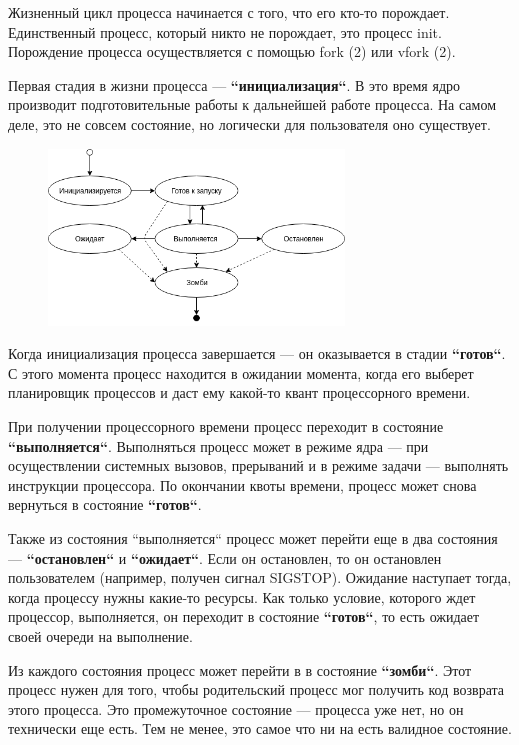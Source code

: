 Жизненный цикл процесса начинается с того, что его кто-то порождает. Единственный процесс, который никто не порождает, это процесс init. Порождение процесса осуществляется с помощью fork (2) или vfork (2). 

Первая стадия в жизни процесса --- \textbf{“инициализация“}. В это время ядро производит подготовительные работы к дальнейшей работе процесса. На самом деле, это не совсем состояние, но логически для пользователя оно существует.

\begin{figure}[htbp]
  \centering
  \includegraphics[width=0.7\textwidth]{./processes-and-threads/processes/lifecycle/proc-lifecycle.png}
\end{figure}

Когда инициализация процесса завершается --- он оказывается в стадии \textbf{“готов“}. С этого момента процесс находится в ожидании момента, когда его выберет планировщик процессов и даст ему какой-то квант процессорного времени.

При получении процессорного времени процесс переходит в состояние \textbf{“выполняется“}. Выполняться процесс может в режиме ядра --- при осуществлении системных вызовов, прерываний и в режиме задачи --- выполнять инструкции процессора. По окончании квоты времени, процесс может снова вернуться в состояние \textbf{“готов“}.

Также из состояния “выполняется“ процесс может перейти еще в два состояния --- \textbf{“остановлен“} и \textbf{“ожидает“}. Если он остановлен, то он остановлен пользователем (например, получен сигнал SIGSTOP). Ожидание наступает тогда, когда процессу нужны какие-то ресурсы. Как только условие, которого ждет процессор, выполняется, он переходит в состояние \textbf{“готов“}, то есть ожидает своей очереди на выполнение. 

Из каждого состояния процесс может перейти в в состояние \textbf{“зомби“}. Этот процесс нужен для того, чтобы родительский процесс мог получить код возврата этого процесса. Это промежуточное состояние --- процесса уже нет, но он технически еще есть. Тем не менее, это самое что ни на есть валидное состояние. 

